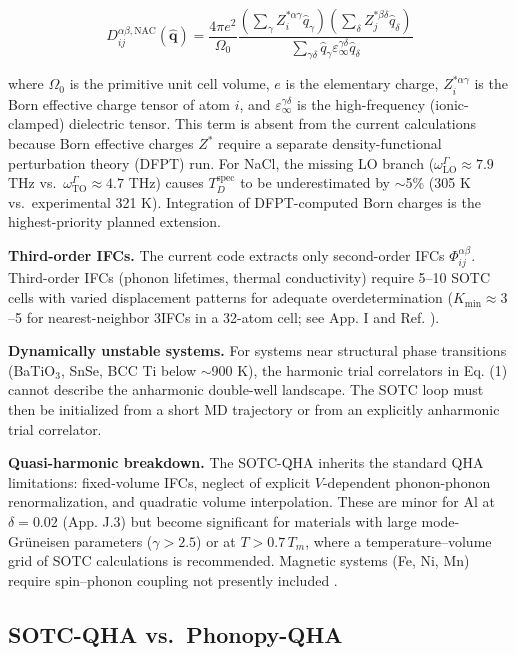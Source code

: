\documentclass[aps,prb,reprint,amsmath,amssymb,floatfix]{revtex4-2}
\begin{document}
\begin{equation*}
D_{ij}^{\alpha\beta,\text{NAC}}(\hat{\mathbf{q}}) = \frac{4\pi e^2}{\Omega_0} \frac{(\sum_\gamma Z_i^{*\alpha\gamma}\hat{q}_\gamma)(\sum_\delta Z_j^{*\beta\delta}\hat{q}_\delta)}{\sum_{\gamma\delta}\hat{q}_\gamma\varepsilon_\infty^{\gamma\delta}\hat{q}_\delta}
\end{equation*}

where \(\Omega_0\) is the primitive unit cell volume, \(e\) is the
elementary charge, \(Z_i^{*\alpha\gamma}\) is the Born effective charge
tensor of atom \(i\), and \(\varepsilon_\infty^{\gamma\delta}\) is the
high-frequency (ionic-clamped) dielectric tensor. This term is absent from the current calculations because Born effective
charges \(Z^*\) require a separate density-functional perturbation
theory (DFPT) run. For NaCl, the missing LO branch
(\(\omega_\text{LO}^\Gamma \approx 7.9\) THz
vs.~\(\omega_\text{TO}^\Gamma \approx 4.7\) THz) causes
\(T_D^\text{spec}\) to be underestimated by $\sim$5\% (305 K
vs.~experimental 321 K). Integration of DFPT-computed Born charges is
the highest-priority planned extension.

\textbf{Third-order IFCs.} The current code extracts only second-order
IFCs \(\Phi_{ij}^{\alpha\beta}\). Third-order IFCs (phonon lifetimes,
thermal conductivity) require 5--10 SOTC cells with varied displacement
patterns for adequate overdetermination (\(K_\text{min} \approx 3\)--5
for nearest-neighbor 3IFCs in a 32-atom cell; see App. I and Ref.
\cite{ref40}).

\textbf{Dynamically unstable systems.} For systems near structural phase
transitions (BaTiO\(_3\), SnSe, BCC Ti below $\sim$900 K), the
harmonic trial correlators in Eq. (1) cannot describe the anharmonic
double-well landscape. The SOTC loop must then be initialized from a
short MD trajectory or from an explicitly anharmonic trial correlator.

\textbf{Quasi-harmonic breakdown.} The SOTC-QHA inherits the standard
QHA limitations: fixed-volume IFCs, neglect of explicit \(V\)-dependent
phonon-phonon renormalization, and quadratic volume interpolation. These
are minor for Al at \(\delta = 0.02\) (App. J.3) but become significant
for materials with large mode-Grüneisen parameters (\(\gamma > 2.5\)) or
at \(T > 0.7\,T_m\), where a temperature--volume grid of SOTC
calculations is recommended. Magnetic systems (Fe, Ni, Mn) require
spin--phonon coupling not presently included \cite{ref41}.

\subsection{SOTC-QHA vs.~Phonopy-QHA}\label{sotc-qha-vs.-phonopy-qha}
\end{document}
